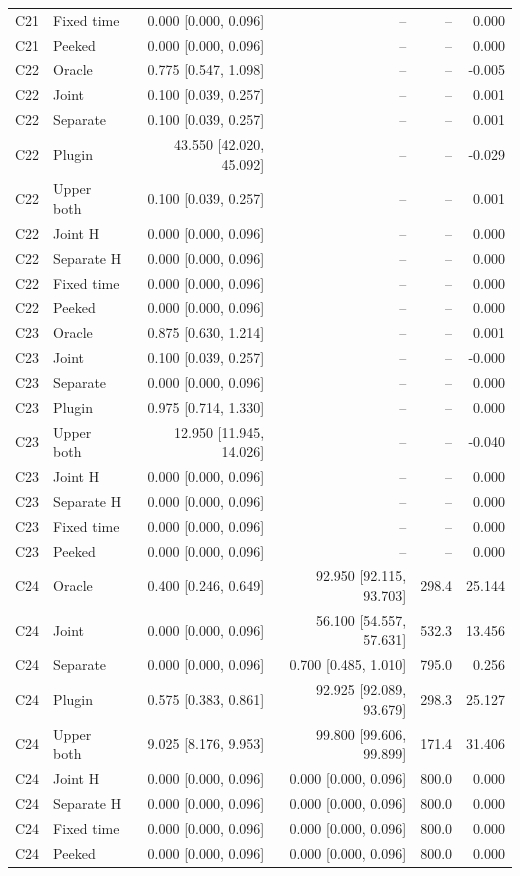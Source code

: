 \begin{longtable}{llrrrr}
C21 & Fixed time & 0.000 [0.000, 0.096] & -- & -- & 0.000\\
C21 & Peeked & 0.000 [0.000, 0.096] & -- & -- & 0.000\\
C22 & Oracle & 0.775 [0.547, 1.098] & -- & -- & -0.005\\
C22 & Joint & 0.100 [0.039, 0.257] & -- & -- & 0.001\\
C22 & Separate & 0.100 [0.039, 0.257] & -- & -- & 0.001\\
C22 & Plugin & 43.550 [42.020, 45.092] & -- & -- & -0.029\\
C22 & Upper both & 0.100 [0.039, 0.257] & -- & -- & 0.001\\
C22 & Joint H & 0.000 [0.000, 0.096] & -- & -- & 0.000\\
C22 & Separate H & 0.000 [0.000, 0.096] & -- & -- & 0.000\\
C22 & Fixed time & 0.000 [0.000, 0.096] & -- & -- & 0.000\\
C22 & Peeked & 0.000 [0.000, 0.096] & -- & -- & 0.000\\
C23 & Oracle & 0.875 [0.630, 1.214] & -- & -- & 0.001\\
C23 & Joint & 0.100 [0.039, 0.257] & -- & -- & -0.000\\
C23 & Separate & 0.000 [0.000, 0.096] & -- & -- & 0.000\\
C23 & Plugin & 0.975 [0.714, 1.330] & -- & -- & 0.000\\
C23 & Upper both & 12.950 [11.945, 14.026] & -- & -- & -0.040\\
C23 & Joint H & 0.000 [0.000, 0.096] & -- & -- & 0.000\\
C23 & Separate H & 0.000 [0.000, 0.096] & -- & -- & 0.000\\
C23 & Fixed time & 0.000 [0.000, 0.096] & -- & -- & 0.000\\
C23 & Peeked & 0.000 [0.000, 0.096] & -- & -- & 0.000\\
C24 & Oracle & 0.400 [0.246, 0.649] & 92.950 [92.115, 93.703] & 298.4 & 25.144\\
C24 & Joint & 0.000 [0.000, 0.096] & 56.100 [54.557, 57.631] & 532.3 & 13.456\\
C24 & Separate & 0.000 [0.000, 0.096] & 0.700 [0.485, 1.010] & 795.0 & 0.256\\
C24 & Plugin & 0.575 [0.383, 0.861] & 92.925 [92.089, 93.679] & 298.3 & 25.127\\
C24 & Upper both & 9.025 [8.176, 9.953] & 99.800 [99.606, 99.899] & 171.4 & 31.406\\
C24 & Joint H & 0.000 [0.000, 0.096] & 0.000 [0.000, 0.096] & 800.0 & 0.000\\
C24 & Separate H & 0.000 [0.000, 0.096] & 0.000 [0.000, 0.096] & 800.0 & 0.000\\
C24 & Fixed time & 0.000 [0.000, 0.096] & 0.000 [0.000, 0.096] & 800.0 & 0.000\\
C24 & Peeked & 0.000 [0.000, 0.096] & 0.000 [0.000, 0.096] & 800.0 & 0.000\\
\bottomrule\end{longtable}
